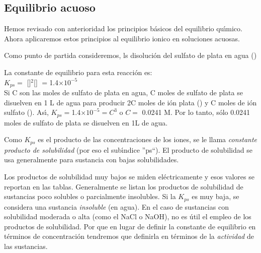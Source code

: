 \subsection{Equilibrio acuoso}

Hemos revisado con anterioridad los principios b\'asicos del equilibrio qu\'{\i}mico. Ahora aplicaremos estos principios al equilibrio ionico en soluciones acuosas.

Como punto de partida consideremos, ls disoluci\'on del sulfato de plata en agua ()
 
La constante de equilibrio para esta reacci\'on es:\\[2pt]

\hskip 3cm $K_{ps} = $ []$^2$[] $=$1.4$\times10^{-5}$\\[2pt]

Si C son las moles de sulfato de plata en agua,  C moles de sulfato de plata se disuelven en 1 L de agua para producir 2C moles de i\'on plata () y C moles de i\'on sulfato (). As\'{\i}, $K_{ps}=$1.4$\times10^{-5} = C^3$ o $C=$ 0.0241 M. Por lo tanto, s\'olo 0.0241 moles de sulfato de plata se disuelven en 1L de agua.

Como $K_{ps}$ es el producto de las concentraciones de los iones, se le llama \emph{constante producto de solubilidad} (por eso el sub\'{\i}ndice ''ps``). El producto de solubilidad se usa generalmente para sustancia con bajas solubilidades. 

Los productos de solubilidad muy bajos se miden el\'ectricamente y esos valores se reportan en las tablas. Generalmente se listan los productos de solubilidad de sustancias poco solubles o parcialmente insolubles. Si la $K_{ps}$ es muy baja, se considera una sustancia \emph{insoluble} (en agua). En el caso de sustancias con solubilidad moderada o alta (como el NaCl o NaOH), no es \'util el empleo de los productos de solubilidad. Por que en lugar de definir  la constante de equilibrio en t\'erminos de concentraci\'on tendremos que definirla en t\'erminos de la \emph{actividad} de las sustancias.

